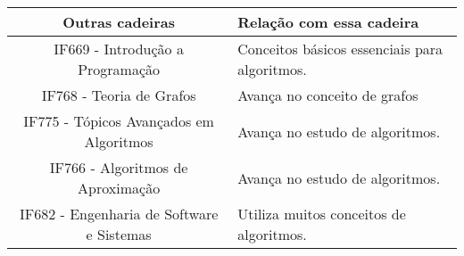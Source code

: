 \documentclass[10pt]{article}
\begin{document}
\begin{tabular}{||c|p{4.5cm}||}
\hline
Outras cadeiras & Relação com essa cadeira \\ \hline
IF669 - Introdução a Programação          & Conceitos básicos essenciais para algoritmos. \\ \hline
IF768 - Teoria de Grafos                  & Avança no conceito de grafos
\\ \hline
IF775 - Tópicos Avançados em Algoritmos   & Avança no estudo de algoritmos.                                                                                                          \\ \hline
IF766 - Algoritmos de Aproximação         & Avança no estudo de algoritmos.                                                                                                      \\ \hline
IF682 - Engenharia de Software e Sistemas & Utiliza muitos conceitos de algoritmos.                                                                                                      \\
\hline
 \end{tabular}
 
\renewcommand\refname{Bibliografia}


\end{document}
